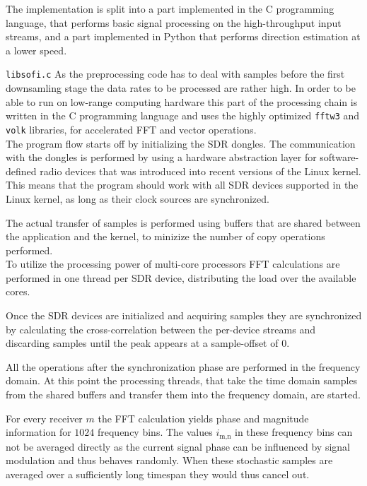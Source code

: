 The implementation is split into a part implemented in
the C programming language, that performs basic signal
processing on the high-throughput input streams, and
a part implemented in Python that performs direction estimation
at a lower speed.

\begin{subchapter}{\texttt{libsofi.c}}
  As the preprocessing code has to deal with samples
  before the first downsamling stage the data rates to be
  processed are rather high.
  In order to be able to run on low-range computing hardware
  this part of the processing chain is written in the C
  programming language and
  uses the highly optimized \texttt{fftw3} and \texttt{volk}
  libraries, for accelerated FFT and vector operations. \\

  The program flow starts off by initializing the SDR
  dongles. The communication with the dongles is performed
  by using a hardware abstraction layer for software-defined radio
  devices that was introduced into recent versions of
  the Linux kernel. This means that the program should work
  with all SDR devices supported in the Linux kernel,
  as long as their clock sources are synchronized.

  The actual transfer of samples is performed using
  buffers that are shared between the application and
  the kernel, to minizize the number of copy operations performed. \\

  To utilize the processing power of multi-core processors
  FFT calculations are performed in one thread per
  SDR device, distributing the load over the available cores.

  Once the SDR devices are initialized and acquiring samples
  they are synchronized by calculating the
  cross-correlation between the per-device streams
  and discarding samples until the peak appears at a
  sample-offset of $0$.

  All the operations after the synchronization phase are
  performed in the frequency domain.
  At this point the processing threads, that
  take the time domain samples from the shared buffers and transfer
  them into the frequency domain, are started.

  For every receiver $m$ the FFT calculation yields phase
  and magnitude information for $1024$ frequency bins.
  The values $i_\text{m,n}$ in these frequency bins can not
  be averaged directly as the current signal phase can be
  influenced by signal modulation and thus behaves randomly.
  When these stochastic samples are averaged over a sufficiently long
  timespan they would thus cancel out. \\


\end{subchapter}
